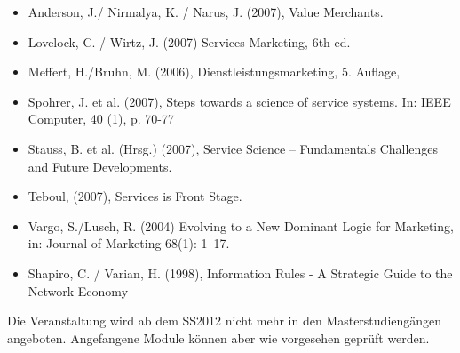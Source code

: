 \begin{course}
\begin{literature}\begin{itemize}\item Anderson, J./ Nirmalya, K. / Narus, J. (2007), Value Merchants.  \item Lovelock, C. / Wirtz, J. (2007) Services Marketing, 6th ed.  \item Meffert, H./Bruhn, M. (2006), Dienstleistungsmarketing, 5. Auflage,  \item Spohrer, J. et al. (2007), Steps towards a science of service systems. In: IEEE Computer, 40 (1), p. 70-77  \item Stauss, B. et al. (Hrsg.) (2007), Service Science – Fundamentals Challenges and Future Developments.  \item Teboul, (2007), Services is Front Stage.  \item Vargo, S./Lusch, R. (2004) Evolving to a New Dominant Logic for Marketing, in: Journal of Marketing 68(1): 1–17.  \item Shapiro, C. / Varian, H. (1998), Information Rules - A Strategic Guide to the Network Economy  \end{itemize}\end{literature}

\begin{remarks}Die Veranstaltung wird ab dem SS2012 nicht mehr in den Masterstudiengängen angeboten. Angefangene Module können aber wie vorgesehen geprüft werden.

\end{remarks}

\end{course}